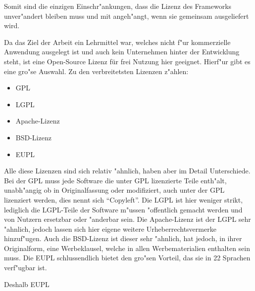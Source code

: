 Somit sind die einzigen Einschr"ankungen, dass die Lizenz des Frameworks unver"andert bleiben muss und mit angeh"angt, wenn sie gemeinsam ausgeliefert wird.

Da das Ziel der Arbeit ein Lehrmittel war, welches nicht f"ur kommerzielle Anwendung ausgelegt ist und auch kein Unternehmen hinter der Entwicklung steht, ist eine Open-Source Lizenz für frei Nutzung hier geeignet. Hierf"ur gibt es eine gro"se Auswahl. Zu den verbreitetsten Lizenzen z"ahlen:

\begin{itemize}
	\item \ac{GPL}
	\item \ac{LGPL}
	\item Apache-Lizenz
	\item \ac{BSD}-Lizenz
	\item \ac{EUPL}
\end{itemize}

Alle diese Lizenzen sind sich relativ "ahnlich, haben aber im Detail Unterschiede.
Bei der \ac{GPL} muss jede Software die unter GPL lizenzierte Teile enth"alt, unabh"angig ob in Originalfassung oder modifiziert, auch unter der \ac{GPL} lizenziert werden, dies nennt sich "`Copyleft"'.
Die \ac{LGPL} ist hier weniger strikt, lediglich die \ac{LGPL}-Teile der Software m"ussen "offentlich gemacht werden und von Nutzern ersetzbar oder "anderbar sein.
Die Apache-Lizenz ist der \ac{LGPL} sehr "ahnlich, jedoch lassen sich hier eigene weitere Urheberrechtsvermerke hinzuf"ugen.
Auch die \ac{BSD}-Lizenz ist dieser sehr "ahnlich, hat jedoch, in ihrer Originalform, eine Werbeklausel, welche in allen Werbematerialien enthalten sein muss.
Die \ac{EUPL} schlussendlich bietet den gro"sen Vorteil, das sie in 22 Sprachen verf"ugbar ist.

Deshalb EUPL